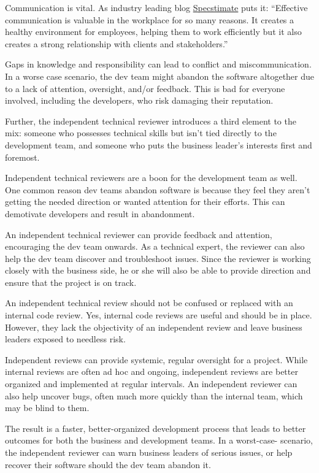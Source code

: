 \documentclass{main}
\begin{document}
Communication is vital. As industry leading blog
\href{https://medium.com/specstimate/10-reasons-why-software-development-projects-fail-7200e7c9ae2e}{Specstimate}
puts it:  ``Effective communication is
valuable in the workplace for so many reasons. It creates a healthy environment
for employees, helping them to work efficiently but it also creates a strong
relationship with clients and stakeholders.''

Gaps in knowledge and responsibility can lead to conflict and miscommunication.
In a worse case scenario, the dev team might abandon the software altogether due
to a lack of attention, oversight, and/or feedback. This is bad for everyone
involved, including the developers, who risk damaging their reputation.

Further, the independent technical reviewer introduces a third element to the
mix: someone who possesses technical skills but isn’t tied directly to the
development team, and someone who puts the business leader’s interests first and
foremost.

Independent technical reviewers are a boon for the development team as well. One
common reason dev teams abandon software is because they feel they aren’t
getting the needed direction or wanted attention for their efforts. This can
demotivate developers and result in abandonment.

An independent technical reviewer can provide feedback and attention,
encouraging the dev team onwards. As a technical expert, the reviewer can also
help the dev team discover and troubleshoot issues. Since the reviewer is
working closely with the business side, he or she will also be able to provide
direction and ensure that the project is on track.

An independent technical review should not be confused or replaced with an
internal code review. Yes, internal code reviews are useful and should be in
place. However, they lack the objectivity of an independent review and leave
business leaders exposed to needless risk.

Independent reviews can provide systemic, regular oversight for a project. While
internal reviews are often ad hoc and ongoing, independent reviews are better
organized and implemented at regular intervals. An independent reviewer can also
help uncover bugs, often much more quickly than the internal team, which may be
blind to them.

The result is a faster, better-organized development process that leads to
better outcomes for both the business and development teams. In a worst-case-
scenario, the independent reviewer can warn business leaders of serious issues,
or help recover their software should the dev team abandon it.
\end{document}
